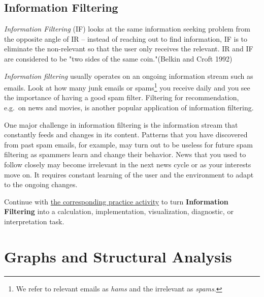 \documentclass[
  letterpaper,
]{scrbook}
\begin{document}
\section{Information Filtering}\label{information-filtering}

\emph{Information Filtering} (IF) looks at the same information seeking
problem from the opposite angle of IR -- instead of reaching out to find
information, IF is to eliminate the non-relevant so that the user only
receives the relevant. IR and IF are considered to be "two sides of the
same coin."(Belkin and Croft 1992)

\emph{Information filtering} usually operates on an ongoing information
stream such as emails. Look at how many junk emails or spams\footnote{We
  refer to relevant emails as \emph{hams} and the irrelevant as
  \emph{spams}.} you receive daily and you see the importance of having
a good spam filter. Filtering for recommendation, e.g.~on news and
movies, is another popular application of information filtering.

One major challenge in information filtering is the information stream
that constantly feeds and changes in its content. Patterns that you have
discovered from past spam emails, for example, may turn out to be
useless for future spam filtering as spammers learn and change their
behavior. News that you used to follow closely may become irrelevant in
the next news cycle or as your interests move on. It requires constant
learning of the user and the environment to adapt to the ongoing
changes.

\begin{tcolorbox}[enhanced jigsaw, arc=.35mm, bottomrule=.15mm, bottomtitle=1mm, breakable, colback=white, colbacktitle=quarto-callout-tip-color!10!white, colframe=quarto-callout-tip-color-frame, coltitle=black, left=2mm, leftrule=.75mm, opacityback=0, opacitybacktitle=0.6, rightrule=.15mm, title=\textcolor{quarto-callout-tip-color}{\faLightbulb}\hspace{0.5em}{Put it into practice}, titlerule=0mm, toprule=.15mm, toptitle=1mm]

Continue with \hyperref[sec-pr-12-information-filtering]{the
corresponding practice activity} to turn \textbf{Information Filtering}
into a calculation, implementation, visualization, diagnostic, or
interpretation task.

\end{tcolorbox}

\chapter{Graphs and Structural Analysis}\label{ch-graphs}
\end{document}
